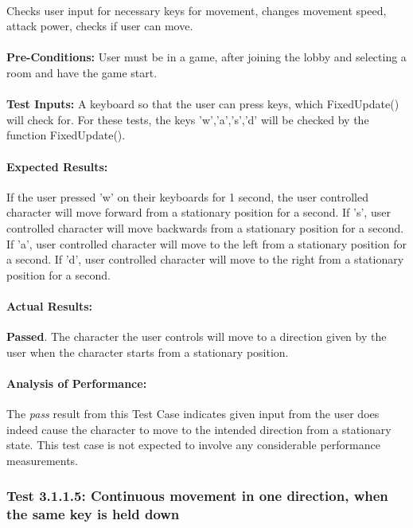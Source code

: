 \documentclass{article}
\begin{document}
    \paragraph{} Checks user input for necessary keys for movement, changes movement speed, attack power, checks if user can move.
    \paragraph{}\textbf{Pre-Conditions:} User must be in a game, after joining the lobby and selecting a room and have the game start.
    \paragraph{}\textbf{Test Inputs:} A keyboard so that the user can press keys, which FixedUpdate() will check for. For these tests, the keys 'w','a','s','d' will be checked by the function FixedUpdate(). 
    \paragraph{Expected Results:} If the user pressed 'w' on their keyboards for 1 second, the user controlled character will move forward from a stationary position for a second. If 's', user controlled character will move backwards from a stationary position for a second. If 'a', user controlled character will move to the left from a stationary position for a second. If 'd', user controlled character will move to the right from a stationary position for a second.
    \paragraph{Actual Results:} \textbf{Passed}. The character the user controls will move to a direction given by the user when the character starts from a stationary position.
    \paragraph{Analysis of Performance:} The \emph{pass} result from this Test Case indicates given input from the user does indeed cause the character to move to the intended direction from a stationary state. This test case is not expected to involve any considerable performance measurements.
    
    \subsubsection{Test 3.1.1.5: Continuous movement in one direction, when the same key is held down}
\end{document}
